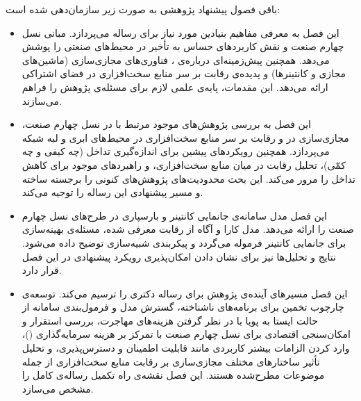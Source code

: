 باقی‌ فصول پیشنهاد پژوهشی به صورت زیر سازمان‌دهی شده است:
\begin{itemize}
\item
\textbf{}
این فصل به معرفی مفاهیم بنیادین مورد نیاز برای رساله می‌پردازد. مبانی نسل چهارم صنعت و نقش کاربردهای حساس به تأخیر در محیط‌های صنعتی را پوشش می‌دهد. همچنین پیش‌زمینه‌ای درباره‌ی ، فناوری‌های مجازی‌سازی (ماشین‌های مجازی و کانتینرها) و پدیده‌ی رقابت بر سر منابع سخت‌افزاری در فضای اشتراکی ارائه می‌دهد. این مقدمات، پایه‌ی علمی لازم برای مسئله‌ی پژوهش را فراهم می‌سازند.

\item
\textbf{}
این فصل به بررسی پژوهش‌های موجود مرتبط با  در نسل چهارم صنعت، مجازی‌سازی در  و رقابت بر سر منابع سخت‌افزاری در محیط‌های ابری و لبه‌ شبکه می‌پردازد. همچنین رویکردهای پیشین برای اندازه‌گیری تداخل (چه کیفی و چه کمّی)، تحلیل رقابت در میان منابع سخت‌افزاری، و راهبردهای موجود برای کاهش تداخل را مرور می‌کند. این بحث محدودیت‌های پژوهش‌های کنونی را برجسته ساخته و مسیر پیشنهادی این رساله را توجیه می‌کند.

\item
\textbf{}
این فصل مدل سامانه‌ی جانمایی کانتینر و بارسپاری در طرح‌های  نسل چهارم صنعت را ارائه می‌دهد. مدل کارا و آگاه از رقابت معرفی شده، مسئله‌ی بهینه‌سازی برای جانمایی کانتینر فرموله می‌گردد و پیکربندی شبیه‌سازی توضیح داده می‌شود. نتایج و تحلیل‌ها نیز برای نشان دادن امکان‌پذیری رویکرد پیشنهادی در این فصل قرار دارد.

\item
\textbf{}
این فصل مسیرهای آینده‌ی پژوهش برای رساله دکتری را ترسیم می‌کند. توسعه‌ی چارچوب تخمین برای برنامه‌های ناشناخته، گسترش مدل و فرمول‌بندی سامانه از حالت ایستا به پویا با در نظر گرفتن هزینه‌های مهاجرت، بررسی استقرار و امکان‌سنجی اقتصادی  برای نسل چهارم صنعت با تمرکز بر هزینه سرمایه‌گذاری ()، وارد کردن الزامات بیشتر کاربردی مانند قابلیت اطمینان و دسترس‌پذیری، و تحلیل تأثیر ساختارهای مختلف مجازی‌سازی بر رقابت منابع سخت‌افزاری از جمله موضوعات مطرح‌شده هستند. این فصل نقشه‌ی راه تکمیل رساله‌ی کامل را مشخص می‌سازد.

\end{itemize}
